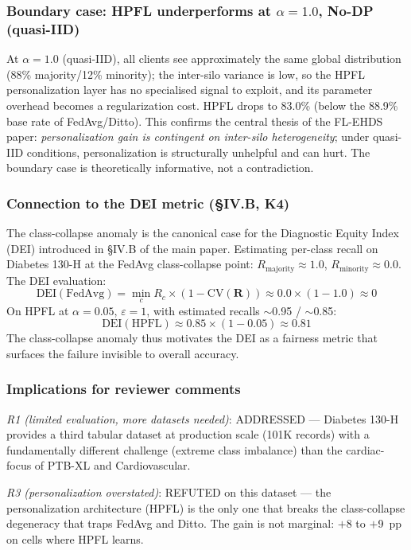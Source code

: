 \documentclass[conference]{IEEEtran}
\begin{document}
\subsubsection*{Boundary case: HPFL underperforms at $\alpha{=}1.0$, No-DP (quasi-IID)}

At $\alpha{=}1.0$ (quasi-IID), all clients see approximately the same global distribution (88\% majority/12\% minority); the inter-silo variance is low, so the HPFL personalization layer has no specialised signal to exploit, and its parameter overhead becomes a regularization cost. HPFL drops to 83.0\% (below the 88.9\% base rate of FedAvg/Ditto). This confirms the central thesis of the FL-EHDS paper: \emph{personalization gain is contingent on inter-silo heterogeneity}; under quasi-IID conditions, personalization is structurally unhelpful and can hurt. The boundary case is theoretically informative, not a contradiction.

\subsubsection*{Connection to the DEI metric (§IV.B, K4)}

The class-collapse anomaly is the canonical case for the Diagnostic Equity Index (DEI) introduced in §IV.B of the main paper. Estimating per-class recall on Diabetes 130-H at the FedAvg class-collapse point: $R_{\text{majority}}\approx 1.0$, $R_{\text{minority}}\approx 0.0$. The DEI evaluation:
\[
\text{DEI}(\text{FedAvg}) = \min_c R_c \times (1 - \text{CV}(\mathbf{R})) \approx 0.0 \times (1 - 1.0) \approx 0
\]
On HPFL at $\alpha{=}0.05$, $\varepsilon{=}1$, with estimated recalls $\sim$0.95 / $\sim$0.85:
\[
\text{DEI}(\text{HPFL}) \approx 0.85 \times (1 - 0.05) \approx 0.81
\]
The class-collapse anomaly thus motivates the DEI as a fairness metric that surfaces the failure invisible to overall accuracy.

\subsubsection*{Implications for reviewer comments}

\emph{R1 (limited evaluation, more datasets needed)}: ADDRESSED --- Diabetes 130-H provides a third tabular dataset at production scale (101K records) with a fundamentally different challenge (extreme class imbalance) than the cardiac-focus of PTB-XL and Cardiovascular.

\emph{R3 (personalization overstated)}: REFUTED on this dataset --- the personalization architecture (HPFL) is the only one that breaks the class-collapse degeneracy that traps FedAvg and Ditto. The gain is not marginal: $+$8 to $+$9~pp on cells where HPFL learns.
\end{document}
